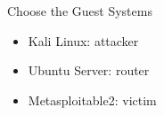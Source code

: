 \begin{frame}{Choose the Guest Systems}
  \begin{itemize}
    \item Kali Linux: attacker
    \item Ubuntu Server: router
    \item Metasploitable2: victim
  \end{itemize}
\end{frame}
